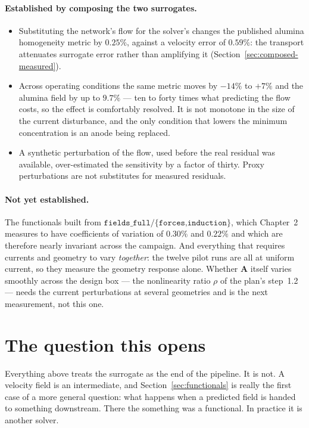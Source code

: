 \documentclass[11pt,a4paper]{article}
\newcommand{\vect}[1]{\mathbf{#1}}
\theoremstyle{plain}
\theoremstyle{definition}
\theoremstyle{remark}
\begin{document}
\paragraph{Established by composing the two surrogates.}
\begin{itemize}\itemsep2pt
\item Substituting the network's flow for the solver's changes the published
alumina homogeneity metric by $0.25\%$, against a velocity error of $0.59\%$:
the transport attenuates surrogate error rather than amplifying it
(Section~\ref{sec:composed-measured}).
\item Across operating conditions the same metric moves by $-14\%$ to $+7\%$ and
the alumina field by up to $9.7\%$ --- ten to forty times what predicting the
flow costs, so the effect is comfortably resolved. It is not monotone in the size
of the current disturbance, and the only condition that lowers the minimum
concentration is an anode being replaced.
\item A synthetic perturbation of the flow, used before the real residual was
available, over-estimated the sensitivity by a factor of thirty. Proxy
perturbations are not substitutes for measured residuals.
\end{itemize}

\paragraph{Not yet established.}
The functionals built from $\texttt{fields\_full/\{forces,induction\}}$, which
Chapter~2 measures to have coefficients of variation of $0.30\%$ and $0.22\%$
and which are therefore nearly invariant across the campaign. And everything that requires
currents and geometry to vary \emph{together}: the twelve pilot runs are all at
uniform current, so they measure the geometry response alone. Whether
$\vect{A}$ itself varies smoothly across the design box --- the nonlinearity
ratio $\rho$ of the plan's step~1.2 --- needs the current perturbations at
several geometries and is the next measurement, not this one.

\section{The question this opens}
\label{sec:opens}

Everything above treats the surrogate as the end of the pipeline. It is not. A
velocity field is an intermediate, and Section~\ref{sec:functionals} is really
the first case of a more general question: what happens when a predicted field
is handed to something downstream. There the something was a functional. In
practice it is another solver.
\end{document}
